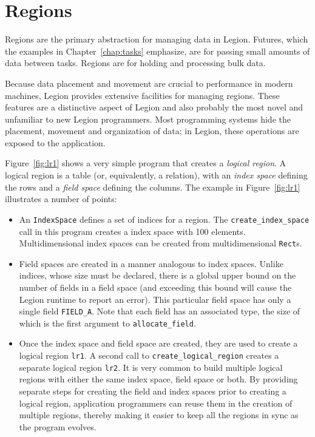 \chapter{Regions}
\label{chap:regions}

Regions are the primary abstraction for managing data in Legion.  Futures,
which the examples in Chapter~\ref{chap:tasks} emphasize, are for passing small amounts of data
between tasks. Regions are for holding and processing bulk data.

Because data placement and movement are crucial to performance in modern machines,
Legion provides extensive facilities for managing regions.  These features are a
distinctive aspect of Legion and also probably the most novel and unfamiliar 
to new Legion programmers.  Most programming systems hide the placement,
movement and organization of data; in Legion, these operations are exposed to
the application.

Figure~\ref{fig:lr1} shows a very simple program that
creates a {\em logical region}.  A logical region is a table (or,
equivalently, a relation), with an {\em index space} defining the rows
and a {\em field space} defining the columns. The example
in Figure~\ref{fig:lr1} illustrates a number of points:

\begin{itemize}

\item An {\tt IndexSpace} defines a set of indices for a region.  The {\tt create\_index\_space}
call in this program creates a index space with 100 elements.  Multidimensional index spaces can be
created from multidimensional {\tt Rect}s.

\item Field spaces are created in a manner analogous to index spaces.
  Unlike indices, whose size must be declared, there is a global upper
  bound on the number of fields in a field space (and exceeding this bound will cause
  the Legion runtime to report an error).  This particular
  field space has only a single field {\tt FIELD\_A}.  Note that each field has an associated type, the
  size of which is the first argument to {\tt allocate\_field}.

\item Once the index space and field space are created, they are used to create
a logical region {\tt lr1}.  A second call to {\tt create\_logical\_region}
creates a separate logical region {\tt lr2}.  It is very common to build
multiple logical regions with either the same index space, field space or both.
By providing separate steps for creating the field and index spaces prior to creating
a logical region, application programmers can reuse them in the creation of multiple
regions, thereby making it easier to keep all the regions in sync as the program 
evolves.
\end{itemize}

